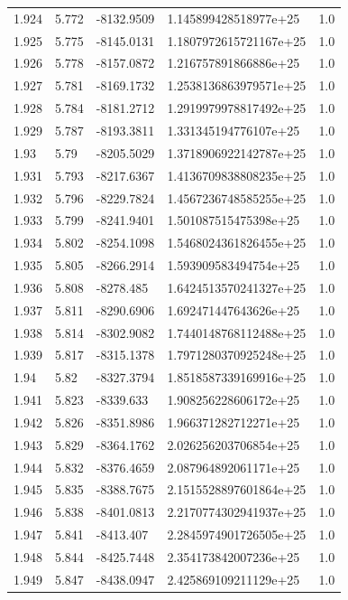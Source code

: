 \begin{tabular}{lllll}
1.924 & 5.772 & -8132.9509 & 1.145899428518977e+25 & 1.0 \\
1.925 & 5.775 & -8145.0131 & 1.1807972615721167e+25 & 1.0 \\
1.926 & 5.778 & -8157.0872 & 1.216757891866886e+25 & 1.0 \\
1.927 & 5.781 & -8169.1732 & 1.2538136863979571e+25 & 1.0 \\
1.928 & 5.784 & -8181.2712 & 1.2919979978817492e+25 & 1.0 \\
1.929 & 5.787 & -8193.3811 & 1.331345194776107e+25 & 1.0 \\
1.93 & 5.79 & -8205.5029 & 1.3718906922142787e+25 & 1.0 \\
1.931 & 5.793 & -8217.6367 & 1.4136709838808235e+25 & 1.0 \\
1.932 & 5.796 & -8229.7824 & 1.4567236748585255e+25 & 1.0 \\
1.933 & 5.799 & -8241.9401 & 1.501087515475398e+25 & 1.0 \\
1.934 & 5.802 & -8254.1098 & 1.5468024361826455e+25 & 1.0 \\
1.935 & 5.805 & -8266.2914 & 1.593909583494754e+25 & 1.0 \\
1.936 & 5.808 & -8278.485 & 1.6424513570241327e+25 & 1.0 \\
1.937 & 5.811 & -8290.6906 & 1.692471447643626e+25 & 1.0 \\
1.938 & 5.814 & -8302.9082 & 1.7440148768112488e+25 & 1.0 \\
1.939 & 5.817 & -8315.1378 & 1.7971280370925248e+25 & 1.0 \\
1.94 & 5.82 & -8327.3794 & 1.8518587339169916e+25 & 1.0 \\
1.941 & 5.823 & -8339.633 & 1.908256228606172e+25 & 1.0 \\
1.942 & 5.826 & -8351.8986 & 1.966371282712271e+25 & 1.0 \\
1.943 & 5.829 & -8364.1762 & 2.026256203706854e+25 & 1.0 \\
1.944 & 5.832 & -8376.4659 & 2.087964892061171e+25 & 1.0 \\
1.945 & 5.835 & -8388.7675 & 2.1515528897601864e+25 & 1.0 \\
1.946 & 5.838 & -8401.0813 & 2.2170774302941937e+25 & 1.0 \\
1.947 & 5.841 & -8413.407 & 2.2845974901726505e+25 & 1.0 \\
1.948 & 5.844 & -8425.7448 & 2.354173842007236e+25 & 1.0 \\
1.949 & 5.847 & -8438.0947 & 2.425869109211129e+25 & 1.0 \\

\end{tabular}
